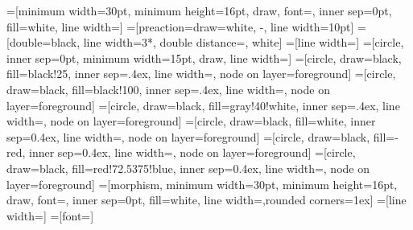 \makeatletter
{}
\def\node@on@layer{\aftergroup\node@@on@layer}
\makeatother\def\thickness{0.7pt}
=[minimum width=30pt, minimum height=16pt, draw, font=\small, inner sep=0pt, fill=white, line width=\thickness]
=[preaction={draw=white, -, line width=10pt}]
=[double=black, line width=3*\thickness, double distance=\thickness, white]
=[line width=\thickness]
=[circle, inner sep=0pt, minimum width=15pt, draw, line width=\thickness]
=[circle, draw=black, fill=black!25, inner sep=.4ex, line width=\thickness, node on layer=foreground]
=[circle, draw=black, fill=black!100, inner sep=.4ex, line width=\thickness, node on layer=foreground]
=[circle, draw=black, fill=gray!40!white, inner sep=.4ex, line width=\thickness, node on layer=foreground]
=[circle, draw=black, fill=white, inner sep=0.4ex, line width=\thickness, node on layer=foreground]
=[circle, draw=black, fill=-red, inner sep=0.4ex, line width=\thickness, node on layer=foreground]
=[circle, draw=black, fill=red!72.5375!blue, inner sep=0.4ex, line width=\thickness, node on layer=foreground]
=[morphism, minimum width=30pt, minimum height=16pt, draw, font=\small, inner sep=0pt, fill=white, line width=\thickness,rounded corners=1ex]
=[line width=\thickness]
=[font=\tiny]


